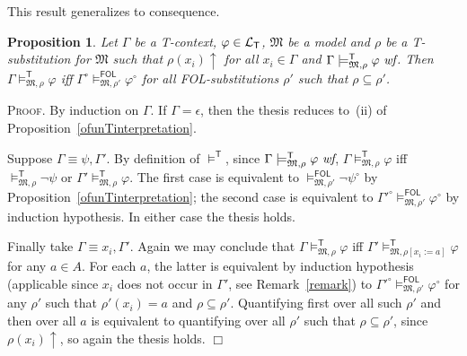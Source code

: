 \documentclass{article}
\newtheorem{proposition}[definition]{Proposition}
\newenvironment{proof}{\smallskip\textsc{Proof.}}{\hspace*{\fill}$\Box$}
\newcommand{\T}{\textsf T}
\newcommand{\FOL}{\textsf{FOL}}
\newcommand{\ofun}[1]{\ensuremath{{#1}^\circ}}
\newcommand{\wf}{\ \mbox{\em wf}}
\newcommand{\undefined}{\ensuremath{\!\uparrow}}
\newcommand{\lang}[1]{\ensuremath{{\cal L}_{\mathsf{#1}}}}
\newcommand{\mymodels}[1]{\ensuremath{\models^{\mathsf{#1}}}}
\newcommand{\mymodelss}[3]{\ensuremath{\models_{\mathfrak{#2},{#3}}^{\mathsf{#1}}}}
\begin{document}
\bigskip\noindent
This result generalizes to consequence.
\begin{proposition}\label{ofunconsequence}
Let $\Gamma$ be a {\T}-context, $\varphi\in\lang{T}$, $\mathfrak M$ be
a model and $\rho$ be a {\T}-substitution for $\mathfrak M$ such
that $\rho(x_i)\undefined$ for all $x_i\in\Gamma$ and
$\Gamma\mymodelss{T}M\rho\varphi\wf$.  Then
$\Gamma\mymodelss{T}M\rho\varphi$ iff
$\ofun\Gamma\mymodelss{FOL}M{\rho'}\ofun\varphi$
for all {\FOL}-substitutions $\rho'$ such that $\rho\subseteq\rho'$.
\end{proposition}
\begin{proof}
By induction on $\Gamma$.  If $\Gamma=\epsilon$, then the thesis
reduces to~(ii) of Proposition~\ref{ofunTinterpretation}.

Suppose $\Gamma\equiv\psi,\Gamma'$.  By definition of $\mymodels{T}$,
since $\Gamma\mymodelss{T}M\rho\varphi\wf$,
$\Gamma\mymodelss{T}M\rho\varphi$ iff
$\mymodelss{T}M\rho\neg\psi$ or $\Gamma'\mymodelss{T}M\rho\varphi$.
The first case is equivalent to $\mymodelss{FOL}M{\rho'}\neg\ofun\psi$
by Proposition~\ref{ofunTinterpretation}; the second case is equivalent
to $\ofun{\Gamma'}\mymodelss{FOL}M{\rho'}\ofun\varphi$ by induction
hypothesis.  In either case the thesis holds.

Finally take $\Gamma\equiv x_i,\Gamma'$.  Again we may conclude that
$\Gamma\mymodelss{T}M\rho\varphi$ iff
$\Gamma'\mymodelss{T}M{\rho[x_i:=a]}\varphi$ for any $a\in A$.  For each
$a$, the latter is equivalent by induction hypothesis (applicable since
$x_i$ does not occur in $\Gamma'$, see Remark~\ref{remark}) to
$\ofun{\Gamma'}\mymodelss{FOL}M{\rho'}\ofun\varphi$ for any $\rho'$
such that $\rho'(x_i)=a$ and $\rho\subseteq\rho'$.  Quantifying first over
all such $\rho'$ and then over all $a$ is equivalent to quantifying over
all $\rho'$ such that $\rho\subseteq\rho'$, since $\rho(x_i)\undefined$,
so again the thesis holds.
\end{proof}
\end{document}
